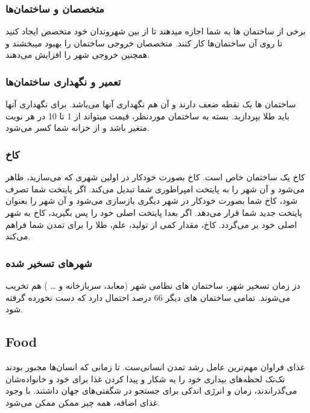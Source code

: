 \documentclass[]{article}
\begin{document}
\subsubsection*{{\titr متخصصان و ساختمان‌ها}}
برخی از ساختمان ها به شما اجازه میدهند تا از بین شهروندان خود متخصص ایجاد کنید تا روی آن ساختمان‌ها کار کنند. متخصصان خروجی ساختمان را بهبود میبخشند و همچنین خروجی شهر را افزایش می‌دهند.


\subsubsection*{{\titr تعمیر و نگهداری ساختمان‌ها}}
ساختمان ها یک نقطه ضعف دارند و آن هم نگهداری آنها می‌باشد. برای نگهداری آنها باید طلا بپردازید. بسته به ساختمان موردنظر‌، قیمت میتواند از 1 تا 10 در هر نوبت متغیر باشد و از خزانه شما کسر می‌شود.


\subsubsection*{{\titr کاخ}}
کاخ یک ساختمان خاص است. کاخ بصورت خودکار در اولین شهری که می‌سازید، ظاهر می‌شود و آن شهر را به پایتخت امپراطوری شما تبدیل می‌کند. اگر پایتخت شما تصرف شود، کاخ شما بصورت خودکار در شهر دیگری بازسازی می‌شود و آن شهر را بعنوان پایتخت جدید شما قرار می‌دهد. اگر بعدا پایتخت اصلی خود را پس بگیرید، کاخ به شهر اصلی خود بر می‌گردد.
کاخ، مقدار کمی از تولید، علم، طلا را برای تمدن شما فراهم می‌کند.


\subsubsection*{{\titr شهرهای تسخیر شده}}
دز زمان تسخیر شهر، ساختمان های نظامی شهر (معابد‌، سربازخانه و … ) هم تخریب می‌شوند. تمامی ساختمان های دیگر 66 درصد احتمال دارد که دست نخورده گرفته شود.


\subsection*{{\titr Food}}
غذای فراوان مهم‌ترین عامل رشد تمدن انسانی‌ست. تا زمانی که انسان‌ها مجبور بودند تک‌تک لحظه‌های بیداری خود را به شکار و پیدا کردن غذا برای خود و خانواده‌شان می‌گذراندند، زمان و انرژی اندکی برای جستجو در شگفتی‌های جهان داشتند. با وجود غذای اضافه، همه چیز ممکن ممکن می‌شود.
\end{document}
